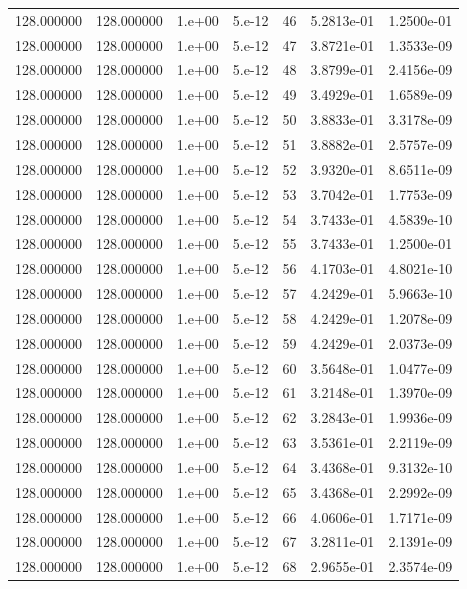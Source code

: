 \begin{table}[htbp]
\begin{tabular}{rrrrrrr}
128.000000 & 128.000000 & 1.e+00 & 5.e-12 & 46 & 5.2813e-01 & 1.2500e-01 \\
128.000000 & 128.000000 & 1.e+00 & 5.e-12 & 47 & 3.8721e-01 & 1.3533e-09 \\
128.000000 & 128.000000 & 1.e+00 & 5.e-12 & 48 & 3.8799e-01 & 2.4156e-09 \\
128.000000 & 128.000000 & 1.e+00 & 5.e-12 & 49 & 3.4929e-01 & 1.6589e-09 \\
128.000000 & 128.000000 & 1.e+00 & 5.e-12 & 50 & 3.8833e-01 & 3.3178e-09 \\
128.000000 & 128.000000 & 1.e+00 & 5.e-12 & 51 & 3.8882e-01 & 2.5757e-09 \\
128.000000 & 128.000000 & 1.e+00 & 5.e-12 & 52 & 3.9320e-01 & 8.6511e-09 \\
128.000000 & 128.000000 & 1.e+00 & 5.e-12 & 53 & 3.7042e-01 & 1.7753e-09 \\
128.000000 & 128.000000 & 1.e+00 & 5.e-12 & 54 & 3.7433e-01 & 4.5839e-10 \\
128.000000 & 128.000000 & 1.e+00 & 5.e-12 & 55 & 3.7433e-01 & 1.2500e-01 \\
128.000000 & 128.000000 & 1.e+00 & 5.e-12 & 56 & 4.1703e-01 & 4.8021e-10 \\
128.000000 & 128.000000 & 1.e+00 & 5.e-12 & 57 & 4.2429e-01 & 5.9663e-10 \\
128.000000 & 128.000000 & 1.e+00 & 5.e-12 & 58 & 4.2429e-01 & 1.2078e-09 \\
128.000000 & 128.000000 & 1.e+00 & 5.e-12 & 59 & 4.2429e-01 & 2.0373e-09 \\
128.000000 & 128.000000 & 1.e+00 & 5.e-12 & 60 & 3.5648e-01 & 1.0477e-09 \\
128.000000 & 128.000000 & 1.e+00 & 5.e-12 & 61 & 3.2148e-01 & 1.3970e-09 \\
128.000000 & 128.000000 & 1.e+00 & 5.e-12 & 62 & 3.2843e-01 & 1.9936e-09 \\
128.000000 & 128.000000 & 1.e+00 & 5.e-12 & 63 & 3.5361e-01 & 2.2119e-09 \\
128.000000 & 128.000000 & 1.e+00 & 5.e-12 & 64 & 3.4368e-01 & 9.3132e-10 \\
128.000000 & 128.000000 & 1.e+00 & 5.e-12 & 65 & 3.4368e-01 & 2.2992e-09 \\
128.000000 & 128.000000 & 1.e+00 & 5.e-12 & 66 & 4.0606e-01 & 1.7171e-09 \\
128.000000 & 128.000000 & 1.e+00 & 5.e-12 & 67 & 3.2811e-01 & 2.1391e-09 \\
128.000000 & 128.000000 & 1.e+00 & 5.e-12 & 68 & 2.9655e-01 & 2.3574e-09 \\

\end{tabular}
\end{table}
